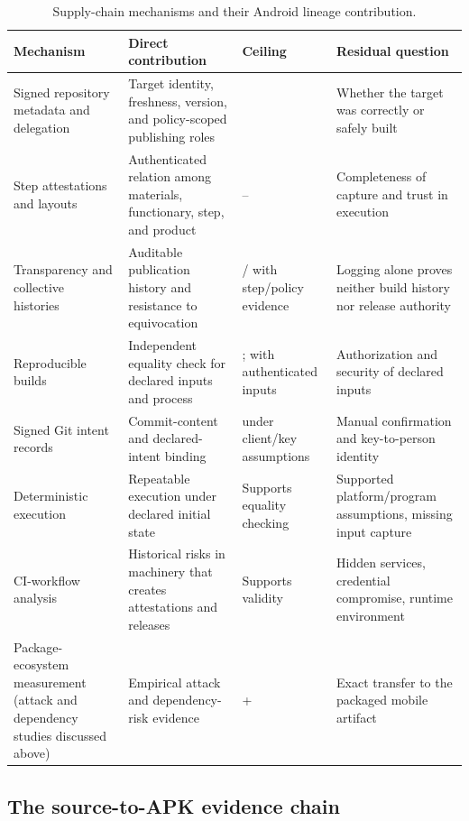 \begin{table}[t]
\caption{Supply-chain mechanisms and their Android lineage contribution.}
\label{tab:supply-mechanisms}
\small
\begin{tabularx}{\textwidth}{L{2.5cm}Y L{1.35cm}Y}
\toprule
Mechanism & Direct contribution & Ceiling & Residual question \\
\midrule
Signed repository metadata and delegation~\cite{tuf,diplomat} & Target identity, freshness, version, and policy-scoped publishing roles &  & Whether the target was correctly or safely built \\
Step attestations and layouts~\cite{intoto} & Authenticated relation among materials, functionary, step, and product & -- & Completeness of capture and trust in execution \\
Transparency and collective histories~\cite{chainiac,contour} & Auditable publication history and resistance to equivocation & / with step/\allowbreak policy evidence & Logging alone proves neither build history nor release authority \\
Reproducible builds~\cite{reprobuilds,chainiac} & Independent equality check for declared inputs and process & ;  with authenticated inputs & Authorization and security of declared inputs \\
Signed Git intent records~\cite{legitimate} & Commit-content and declared-intent binding &  under client/key assumptions & Manual confirmation and key-to-person identity \\
Deterministic execution~\cite{reprocontainers} & Repeatable execution under declared initial state & Supports equality checking & Supported platform/program assumptions, missing input capture \\
CI-workflow analysis~\cite{githubci} & Historical risks in machinery that creates attestations and releases & Supports  validity & Hidden services, credential compromise, runtime environment \\
Package-ecosystem measurement (attack and dependency studies discussed above) & Empirical attack and dependency-risk evidence & + & Exact transfer to the packaged mobile artifact \\
\bottomrule
\end{tabularx}
\end{table}

\subsection{The source-to-APK evidence chain}

